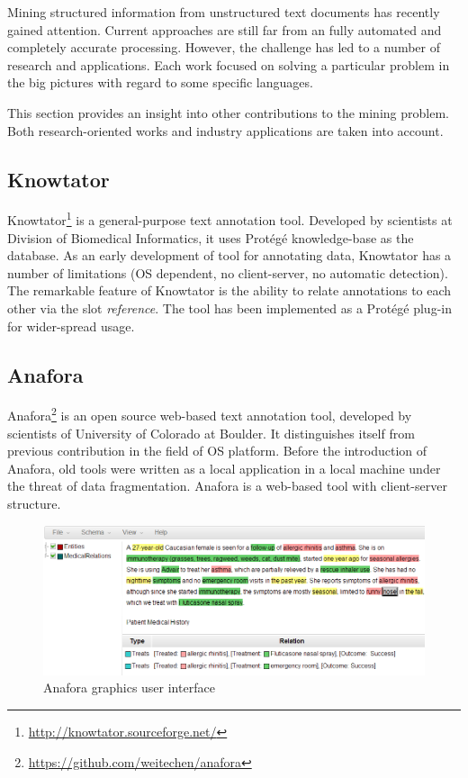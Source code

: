 
Mining structured information from unstructured text documents has recently gained attention.
Current approaches are still far from an fully automated and completely accurate processing.
However, the challenge has led to a number of research and applications.
Each work focused on solving a particular problem in the big pictures with regard to some specific languages. 

This section provides an insight into other contributions to the mining problem.
Both research-oriented works and industry applications are taken into account.

\subsection{Knowtator}
Knowtator\footnote{\url{http://knowtator.sourceforge.net/}} is a general-purpose text annotation tool.
Developed by scientists at Division of Biomedical Informatics, 
it uses Protégé knowledge-base as the database.
As an early development of tool for annotating data, Knowtator has a number of limitations (OS dependent, no client-server, no automatic detection).
The remarkable feature of Knowtator is the ability to relate annotations to each other via the slot \textit{reference}.
The tool has been implemented as a Protégé plug-in for wider-spread usage.

\subsection{Anafora}

Anafora\footnote{\url{https://github.com/weitechen/anafora}} is an open source web-based text annotation tool,
developed by scientists of University of Colorado at Boulder.
It distinguishes itself from previous contribution in the field of OS platform.
Before the introduction of Anafora, old tools were written as a local application in a local machine under the threat of data fragmentation.
Anafora is a web-based tool with client-server structure. %

\begin{figure}[!htb]
	\centering
	\includegraphics[width=\textwidth]{Images/anafora}
	\caption{Anafora graphics user interface}
	\label{fig:First}
\end{figure}

